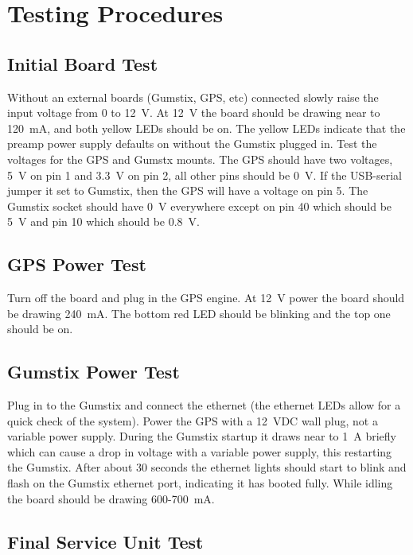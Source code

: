 \section{Testing Procedures}

\subsection{Initial Board Test}
\label{app:suTest1}

Without an external boards (Gumstix, GPS, etc) connected slowly raise the input voltage from 0 to 12~V. 
At 12~V the board should be drawing near to 120~mA, and both yellow LEDs should be on.
The yellow LEDs indicate that the preamp power supply defaults on without the Gumstix plugged in.
Test the voltages for the GPS and Gumstx mounts.
The GPS should have two voltages, 5~V on pin 1 and 3.3~V on pin 2, all other pins should be 0~V.
If the USB-serial jumper it set to Gumstix, then the GPS will have a voltage on pin 5.
The Gumstix socket should have 0~V everywhere except on pin 40 which should be 5~V and pin 10 which should be 0.8~V.

\subsection{GPS Power Test}
\label{app:suTest2}

Turn off the board and plug in the GPS engine.
At 12~V power the board should be drawing 240~mA.
The bottom red LED should be blinking and the top one should be on.

\subsection{Gumstix Power Test}
\label{app:suTest3}

Plug in to the Gumstix and connect the ethernet (the ethernet LEDs allow for a quick check of the system).
Power the GPS with a 12~VDC wall plug, not a variable power supply.
During the Gumstix startup it draws near to 1~A briefly which can cause a drop in voltage with a variable power supply, this restarting the Gumstix.
After about 30 seconds the ethernet lights should start to blink and flash on the Gumstix ethernet port, indicating it has booted fully.
While idling the board should be drawing 600-700~mA.

\subsection{Final Service Unit Test}
\label{app:suTest4}

